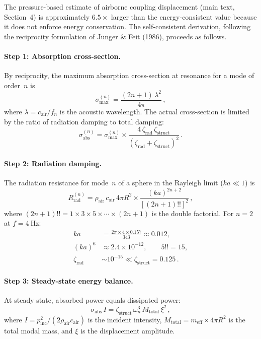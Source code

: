 \documentclass[12pt]{article}
\begin{document}
The pressure-based estimate of airborne coupling displacement
(main text, Section~4) is approximately $6.5\times$ larger than the
energy-consistent value because it does not enforce energy conservation.  The
self-consistent derivation, following the reciprocity formulation of
Junger \& Feit (1986),
proceeds as follows.

\paragraph{Step 1: Absorption cross-section.}
By reciprocity, the maximum absorption cross-section at resonance for a mode
of order~$n$ is
\begin{equation}
  \sigma_{\max}^{(n)} = \frac{(2n+1)\,\lambda^{2}}{4\pi} \,,
  \tag{S13}
  \label{eq:sigma_max}
\end{equation}
where $\lambda = c_{\mathrm{air}}/f_{n}$ is the acoustic wavelength.  The actual
cross-section is limited by the ratio of radiation damping to total damping:
\begin{equation}
  \sigma_{\mathrm{abs}}^{(n)} = \sigma_{\max}^{(n)}
    \times\frac{4\,\zeta_{\mathrm{rad}}\,\zeta_{\mathrm{struct}}}{(\zeta_{\mathrm{rad}} + \zeta_{\mathrm{struct}})^2} \,.
  \tag{S14}
  \label{eq:sigma_abs}
\end{equation}

\paragraph{Step 2: Radiation damping.}
The radiation resistance for mode~$n$ of a sphere in the Rayleigh limit
($ka \ll 1$) is
\begin{equation}
  R_{\mathrm{rad}}^{(n)} = \rho_{\mathrm{air}}\,c_{\mathrm{air}}\,4\pi R^{2}
    \times \frac{(ka)^{2n+2}}{[(2n+1)!!]^{2}} \,,
  \tag{S15}
\end{equation}
where $(2n+1)!! = 1\times3\times5\times\cdots\times(2n+1)$ is the double factorial.
For $n=2$ at $f = \SI{4}{\hertz}$:
\begin{align*}
  ka &= \frac{2\pi \times 4 \times 0.157}{343} \approx 0.012, \\
  (ka)^{6} &\approx 2.4\times10^{-12}, \qquad 5!! = 15, \\
  \zeta_{\mathrm{rad}} &\sim 10^{-15} \ll \zeta_{\mathrm{struct}} = 0.125 \,.
\end{align*}

\paragraph{Step 3: Steady-state energy balance.}
At steady state, absorbed power equals dissipated power:
\begin{equation}
  \sigma_{\mathrm{abs}}\,I = \zeta_{\mathrm{struct}}\,\omega_{n}^{3}\,M_{\mathrm{total}}\,\xi^{2}  \,,
  \tag{S16}
  \label{eq:energy_balance}
\end{equation}
where $I = p_{\mathrm{inc}}^{2}/(2\rho_{\mathrm{air}}c_{\mathrm{air}})$ is the
incident intensity, $M_{\mathrm{total}} = m_{\mathrm{eff}}\times 4\pi R^{2}$ is the
total modal mass, and $\xi$ is the displacement amplitude.
\end{document}
